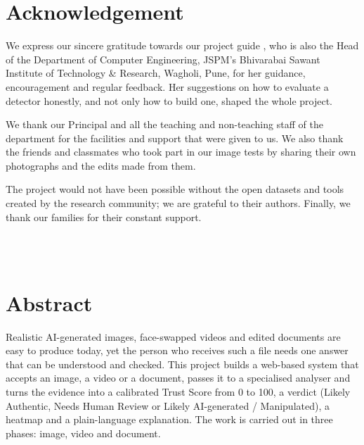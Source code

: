 \documentclass[12pt,a4paper]{report}
\begin{document}
\chapter*{Acknowledgement}
\onehalfspacing
We express our sincere gratitude towards our project guide \textbf{\GuideName}, who is also the Head of the Department of Computer Engineering, JSPM's Bhivarabai Sawant Institute of Technology \& Research, Wagholi, Pune, for her guidance, encouragement and regular feedback. Her suggestions on how to evaluate a detector honestly, and not only how to build one, shaped the whole project.

We thank our Principal and all the teaching and non-teaching staff of the department for the facilities and support that were given to us. We also thank the friends and classmates who took part in our image tests by sharing their own photographs and the edits made from them.

The project would not have been possible without the open datasets and tools created by the research community; we are grateful to their authors. Finally, we thank our families for their constant support.

\vspace{30pt}
\begin{flushright}
  \textbf{\StudentOneName}\\
  \textbf{\StudentTwoName}\\
  \textbf{\StudentThreeName}
\end{flushright}
\newpage

\chapter*{Abstract}
\onehalfspacing
Realistic AI-generated images, face-swapped videos and edited documents are easy to produce today, yet the person who receives such a file needs one answer that can be understood and checked. This project builds a web-based system that accepts an image, a video or a document, passes it to a specialised analyser and turns the evidence into a calibrated Trust Score from 0 to 100, a verdict (Likely Authentic, Needs Human Review or Likely AI-generated / Manipulated), a heatmap and a plain-language explanation. The work is carried out in three phases: image, video and document.
\end{document}
